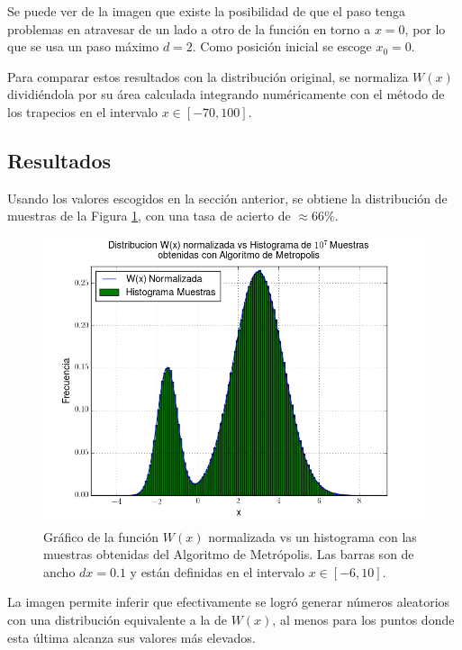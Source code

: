 \documentclass{article}
\begin{document}
Se puede ver de la imagen que existe la posibilidad de que el paso tenga problemas en atravesar de un lado a otro de la función en torno a $ x = 0 $, por lo que se usa un paso máximo $d = 2$. Como posición inicial se escoge $x_0 = 0$.

Para comparar estos resultados con la distribución original, se normaliza $W(x)$ dividiéndola por su área calculada integrando numéricamente con el método de los trapecios en el intervalo $x \in [-70, 100]$.

\subsection{Resultados}

Usando los valores escogidos en la sección anterior, se obtiene la distribución de muestras de la Figura \ref{fig:resultados}, con una tasa de acierto de $\approx 66\%$.

\begin{figure}[ht]
  \centering
  \includegraphics[scale = 0.5]{images/resultado_P2.png}
  \caption{Gráfico de la función $W(x)$ normalizada vs un histograma con las muestras obtenidas del Algoritmo de Metrópolis. Las barras son de ancho $dx = 0.1$ y están definidas en el intervalo $x \in [-6, 10]$.}
  \label{fig:resultados}
\end{figure}

La imagen permite inferir que efectivamente se logró generar números aleatorios con una distribución equivalente a la de $W(x)$, al menos para los puntos donde esta última alcanza sus valores más elevados.
\end{document}
